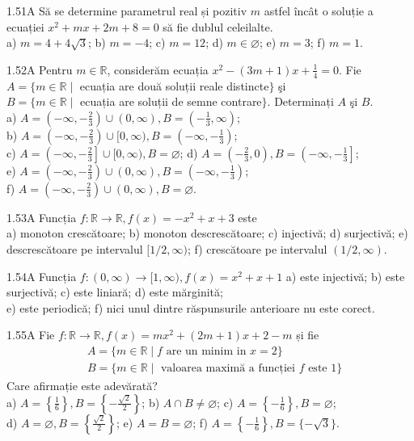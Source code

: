 \documentclass[11pt]{article}
\begin{document}
1.51A Să se determine parametrul real și pozitiv $m$ astfel încât o soluție a ecuației $x^{2}+m x+2 m+8=0$ să fie dublul celeilalte.\\ a) $m=4+4 \sqrt{3}$; b) $m=-4$; c) $m=12$; d) $m \in \varnothing$; e) $m=3$; f) $m=1$.

1.52A Pentru $m \in \mathbb{R}$, considerăm ecuația $x^{2}-(3 m+1) x+\frac{1}{4}=0$. Fie $A=\{m \in \mathbb{R} \mid$ ecuația are două soluții reale distincte$\}$ şi\\ $B=\{m \in \mathbb{R} \mid$ ecuația are soluții de semne contrare$\}$. Determinați $A$ şi $B$.\\ a) $A=\left(-\infty,-\frac{2}{3}\right) \cup(0, \infty), B=\left(-\frac{1}{3}, \infty\right)$;\\ b) $A=\left(-\infty,-\frac{2}{3}\right) \cup[0, \infty), B=\left(-\infty,-\frac{1}{3}\right)$;\\ c) $A=\left(-\infty,-\frac{2}{3}\right] \cup[0, \infty), B=\varnothing$; d) $A=\left(-\frac{2}{3}, 0\right), B=\left(-\infty,-\frac{1}{3}\right]$;\\ e) $A=\left(-\infty,-\frac{2}{3}\right) \cup(0, \infty), B=\left(-\infty,-\frac{1}{3}\right)$;\\ f) $A=\left(-\infty,-\frac{2}{3}\right) \cup(0, \infty), B=\varnothing$.

1.53A Funcția $f: \mathbb{R} \rightarrow \mathbb{R}, f(x)=-x^{2}+x+3$ este\\ a) monoton crescătoare; b) monoton descrescătoare; c) injectivă; d) surjectivă; e) descrescătoare pe intervalul $[1 / 2, \infty)$; f) crescătoare pe intervalul $(1 / 2, \infty)$.

1.54A Funcția $f:(0, \infty) \rightarrow[1, \infty), f(x)=x^{2}+x+1$ a) este injectivă; b) este surjectivă; c) este liniară; d) este mărginită;\\ e) este periodică; f) nici unul dintre răspunsurile anterioare nu este corect.

1.55A Fie $f: \mathbb{R} \rightarrow \mathbb{R}, f(x)=m x^{2}+(2 m+1) x+2-m$ și fie $$\begin{aligned}& A=\{m \in \mathbb{R} \mid f \text { are un minim in } x=2\} \\& B=\{m \in \mathbb{R} \mid \text { valoarea maximă a funcției } f \text { este } 1\}\end{aligned}$$ Care afirmație este adevărată?\\ a) $A=\left\{\frac{1}{6}\right\}, B=\left\{-\frac{\sqrt{2}}{2}\right\}$; b) $A \cap B \neq \varnothing$; c) $A=\left\{-\frac{1}{6}\right\}, B=\varnothing$;\\ d) $A=\varnothing, B=\left\{\frac{\sqrt{2}}{2}\right\}$; e) $A=B=\varnothing$; f) $A=\left\{-\frac{1}{6}\right\}, B=\{-\sqrt{3}\}$.
\end{document}
